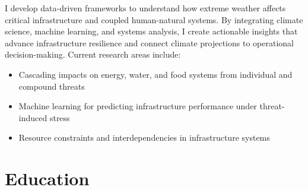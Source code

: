 \documentclass{article}[12pt]
\begin{document}
		I develop data-driven frameworks to understand how extreme weather affects critical infrastructure and coupled human-natural systems. By integrating climate science, machine learning, and systems analysis, I create actionable insights that advance infrastructure resilience and connect climate projections to operational decision-making. Current research areas include:
		\\
		\begin{itemize}[leftmargin=*]
			\item Cascading impacts on energy, water, and food systems from individual and compound threats
			\item Machine learning for predicting infrastructure performance under threat-induced stress
			\item Resource constraints and interdependencies in infrastructure systems
		\end{itemize}
		
		
		\section*{Education}
		
		\vspace{-1.5em}
		
\end{document}

